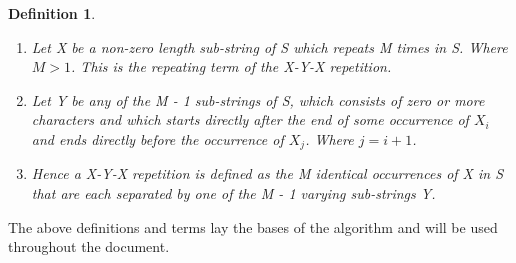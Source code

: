 \documentclass[12pt]{article}
\newtheorem{defn}{Definition}[section]
\begin{document}
\begin{flushleft}
\begin{defn}
\begin{enumerate}
			\item Let X be a non-zero length sub-string of S which repeats M times in S. Where $ M > 1 $. This is the repeating term of the X-Y-X repetition.		
			\item  Let Y be any of the M - 1 sub-strings of S, which consists of zero or more characters and which starts directly after the end of some occurrence of $X_{i}$ and ends directly before the occurrence of $X_{j}$. Where $j = i + 1$.
			\item Hence a X-Y-X repetition is defined as the M identical occurrences of X in S that are each separated by one of the M - 1 varying sub-strings Y.	
		\end{enumerate}
	\end{defn}
	
	The above definitions and terms lay the bases of the algorithm and will be used throughout the document.
\end{flushleft}
\end{document}
